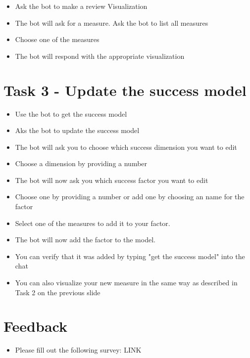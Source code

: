 \begin{itemize}
    \item Ask the bot to make a review Visualization
    \item The bot will ask for a measure. Ask the bot to list all measures
    \item Choose one of the measures 
    \item The bot will respond with the appropriate visualization
\end{itemize}


\section*{Task 3 - Update the success model}
\begin{itemize}
    \item Use the bot to get the success model
    \item Aks the bot to update the success model
    \item The bot will ask you to choose which success dimension you want to edit
    \item Choose a dimension by providing a number
    \item The bot will now ask you which success factor you want to edit
    \item Choose one by providing a number or add one by choosing an name for the factor
    \item Select one of the measures to add it to your factor. 
    \item The bot will now add the factor to the model.
    \item You can verify that it was added by typing "get the success model" into the chat
    \item You can also visualize your new measure in the same way as described in Task 2 on the previous slide
\end{itemize}

\section*{Feedback}
  
\begin{itemize}
  \item Please fill out the following survey: LINK
\end{itemize}


